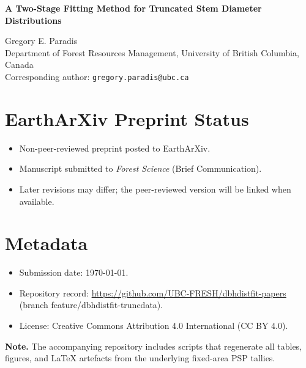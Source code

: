 \documentclass[12pt]{article}
\begin{document}
\thispagestyle{empty}

{\LARGE\bfseries A Two-Stage Fitting Method for Truncated Stem Diameter Distributions\par}

{\large Gregory E. Paradis\\Department of Forest Resources Management, University of British Columbia, Canada\\Corresponding author: \texttt{gregory.paradis@ubc.ca}\par}

\section*{EarthArXiv Preprint Status}
\begin{itemize}[leftmargin=*]
  \item Non-peer-reviewed preprint posted to EarthArXiv.
  \item Manuscript submitted to \emph{Forest Science} (Brief Communication).
  \item Later revisions may differ; the peer-reviewed version will be linked when available.
\end{itemize}

\section*{Metadata}
\begin{itemize}[leftmargin=*]
  \item Submission date: \today.
  \item Repository record: \url{https://github.com/UBC-FRESH/dbhdistfit-papers} (branch feature/dbhdistfit-truncdata).
  \item License: Creative Commons Attribution 4.0 International (CC BY 4.0).
\end{itemize}

\vfill
\textbf{Note.} The accompanying repository includes scripts that regenerate all tables, figures, and LaTeX artefacts from the underlying fixed-area PSP tallies.

\clearpage
\pagestyle{empty}

\end{document}
